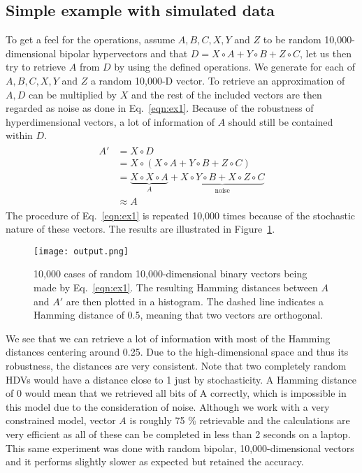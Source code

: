 \subsection*{Simple example with simulated data}
To get a feel for the operations, assume $A, B, C, X, Y$ and $Z$ to be random 10,000-dimensional bipolar hypervectors and that $D = X \circ A + Y \circ B + Z \circ C$, let us then try to retrieve $A$ from $D$ by using the defined operations. We generate for each of $A, B, C, X, Y$ and $Z$ a random 10,000-D vector. To retrieve an approximation of $A, D$ can be multiplied by $X$ and the rest of the included vectors are then regarded as noise as done in Eq.~\ref{eqn:ex1}. Because of the robustness of hyperdimensional vectors, a lot of information of $A$ should still be contained within $D$.
\begin{align}\label{eqn:ex1}
\begin{split}
    A' &= X \circ D \\
    &= X \circ (X \circ A + Y \circ B + Z \circ C) \\
    &= \underbrace{X \circ X \circ A}_A + \underbrace{X \circ Y \circ B + X \circ Z \circ C}_\text{noise} \\
    &\approx A
\end{split}
\end{align}
 The procedure of Eq.~\ref{eqn:ex1} is repeated 10,000 times because of the stochastic nature of these vectors. The results are illustrated in Figure~\ref{fig:exm1}.
\begin{figure}[h]
    \centering
    \texttt{[image: output.png]}
    \caption{10,000 cases of random 10,000-dimensional binary vectors being made by Eq.~\ref{eqn:ex1}. The resulting Hamming distances between $A$ and $A'$ are then plotted in a histogram. The dashed line indicates a Hamming distance of 0.5, meaning that two vectors are orthogonal.}
    \label{fig:exm1}
\end{figure}
We see that we can retrieve a lot of information with most of the Hamming distances centering around 0.25. Due to the high-dimensional space and thus its robustness, the distances are very consistent. Note that two completely random HDVs would have a distance close to 1 just by stochasticity. A Hamming distance of 0 would mean that we retrieved all bits of A correctly, which is impossible in this model due to the consideration of noise. Although we work with a very constrained model, vector $A$ is roughly 75 \% retrievable and the calculations are very efficient as all of these can be completed in less than 2 seconds on a laptop. This same experiment was done with random bipolar, 10,000-dimensional vectors and it performs slightly slower as expected but retained the accuracy.
